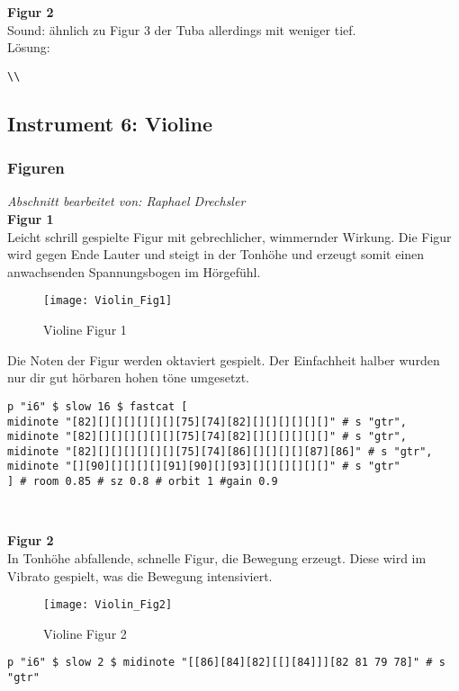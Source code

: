 \documentclass[
10pt, %
a4paper, %
oneside, %
headinclude,footinclude, %
BCOR5mm, %
]{scrartcl}
\begin{document}
\noindent\textbf{Figur 2}\\
Sound: ähnlich zu Figur 3 der Tuba allerdings mit weniger tief.\\
Lösung:\\
\begin{lstlisting}
\\
\end{lstlisting}

\subsection{Instrument 6: Violine}
\subsubsection{Figuren}
\textit{Abschnitt bearbeitet von: Raphael Drechsler}\\

\noindent\textbf{Figur 1}\\
Leicht schrill gespielte Figur mit gebrechlicher, wimmernder Wirkung. Die Figur wird gegen Ende Lauter und steigt in der Tonhöhe und erzeugt somit einen anwachsenden Spannungsbogen im Hörgefühl.
\begin{figure}[h]
	\centering 
	\texttt{[image: Violin\_Fig1]} 
	\caption{Violine Figur 1}
\end{figure}

\noindent Die Noten der Figur werden oktaviert gespielt. Der Einfachheit halber wurden nur dir gut hörbaren hohen töne umgesetzt.

\begin{lstlisting}
p "i6" $ slow 16 $ fastcat [
midinote "[82][][][][][][][75][74][82][][][][][][]" # s "gtr",
midinote "[82][][][][][][][75][74][82][][][][][][]" # s "gtr",
midinote "[82][][][][][][][75][74][86][][][][][87][86]" # s "gtr",
midinote "[][90][][][][][91][90][][93][][][][][][]" # s "gtr"
] # room 0.85 # sz 0.8 # orbit 1 #gain 0.9
\end{lstlisting}\

\noindent\textbf{Figur 2}\\
In Tonhöhe abfallende, schnelle Figur, die Bewegung erzeugt. Diese wird im Vibrato gespielt, was die Bewegung intensiviert.
\begin{figure}[h]
	\centering 
	\texttt{[image: Violin\_Fig2]} 
	\caption{Violine Figur 2}
\end{figure}

\begin{lstlisting}
p "i6" $ slow 2 $ midinote "[[86][84][82][[][84]]][82 81 79 78]" # s "gtr"
\end{lstlisting}
\end{document}

